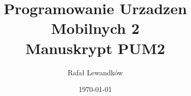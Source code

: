 \documentclass[12pt,a4paper]{book}
\begin{document}
\frontmatter
\title{Programowanie Urzadzen Mobilnych 2\\Manuskrypt PUM2}
\author{Rafał Lewandków}
\date{\today}
\maketitle

\tableofcontents

\mainmatter

% 
% 
% 
% 
% 
% 
% 
% 
% 
% 
% 
% 
% 
% 
% 
















\backmatter
\printbibliography
\end{document}
